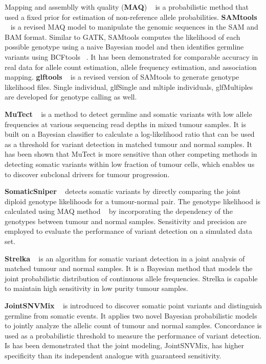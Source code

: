 \documentclass[11pt,reqno]{amsart}
\begin{document}
Mapping and assemblly with quality (\textbf{MAQ}) ~\citep{Li2008} is a probabilistic method that used a fixed prior for estimation of non-reference allele probabilities.
\textbf{SAMtools} ~\citep{Li2009a} is a revised MAQ model to manipulate the genomic sequences in the SAM and BAM format.
Similar to GATK, SAMtools computes the likelihood of each possible genotype using a naive Bayesian model and then identifies germline variants using BCFtools ~\citep{li2011statistical}.
It has been demonstrated for comparable accuracy in real data for allele count estimation, allele frequency estimation, and association mapping.
\textbf{glftools} ~\citep{abecasis2010} is a revised version of SAMtools to generate genotype likelihood files.
Single individual, glfSingle and mltiple individuals, glfMultiples are developed for genotype calling as well.

\textbf{MuTect} ~\citep{Cibulskis2013} is a method to detect germline and somatic variants with low allele frequencies at various sequencing read depths in mixed tumour samples.
It is built on a Bayesian classifier to calculate a log-likelihood ratio that can be used as a threshold for variant detection in matched tumour and normal samples.
It has been shown that MuTect is more sensitive than other competing methods in detecting somatic variants within low fraction of tumour cells, which enables us to discover subclonal drivers for tumour progression.

\textbf{SomaticSniper} ~\citep{Larson2012} detects somatic variants by directly comparing the joint diploid genotype likelihoods for a tumour-normal pair.
The genotype likelihood is calculated using MAQ method ~\citep{Li2008} by incorporating the dependency of the genotypes between tumour and normal samples.
Sensitivity and precision are employed to evaluate the performance of variant detection on a simulated data set.

\textbf{Strelka} ~\citep{Saunders2012} is an algorithm for somatic variant detection in a joint analysis of matched tumour and normal samples.
It is a Bayesian method that models the joint probabilistic distribution of continuous allele frequencies.
Strelka is capable to maintain high sensitivity in low purity tumour samples.

\textbf{JointSNVMix} ~\citep{Roth2012} is introduced to discover somatic point variants and distinguish germline from somatic events.
It applies two novel Bayesian probabilistic models to jointly analyze the allelic count of tumour and normal samples.
Concordance is used as a probabilistic threshold to measure the performance of variant detection.
Is has been demonstrated that the joint modeling, JointSNVMix, has higher specificity than its independent analogue with guaranteed sensitivity.
\end{document}
